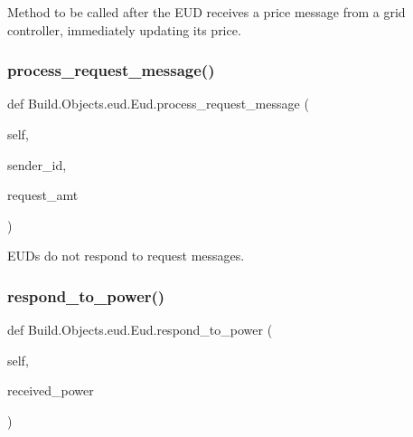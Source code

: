 Method to be called after the E\+UD receives a price message from a grid controller, immediately updating its price. 

\mbox{\label{class_build_1_1_objects_1_1eud_1_1_eud_a4e9b1ca4c510a1f405f5d16b31215cbe}} 
\subsubsection{\texorpdfstring{process\+\_\+request\+\_\+message()}{process\_request\_message()}}
{\footnotesize\ttfamily def Build.\+Objects.\+eud.\+Eud.\+process\+\_\+request\+\_\+message (\begin{DoxyParamCaption}\item[{}]{self,  }\item[{}]{sender\+\_\+id,  }\item[{}]{request\+\_\+amt }\end{DoxyParamCaption})}



E\+UD\textquotesingle{}s do not respond to request messages. 

\mbox{\label{class_build_1_1_objects_1_1eud_1_1_eud_a89a88154fdd5e8a4c9c1207eb3cb3f2f}} 
\subsubsection{\texorpdfstring{respond\+\_\+to\+\_\+power()}{respond\_to\_power()}}
{\footnotesize\ttfamily def Build.\+Objects.\+eud.\+Eud.\+respond\+\_\+to\+\_\+power (\begin{DoxyParamCaption}\item[{}]{self,  }\item[{}]{received\+\_\+power }\end{DoxyParamCaption})}



